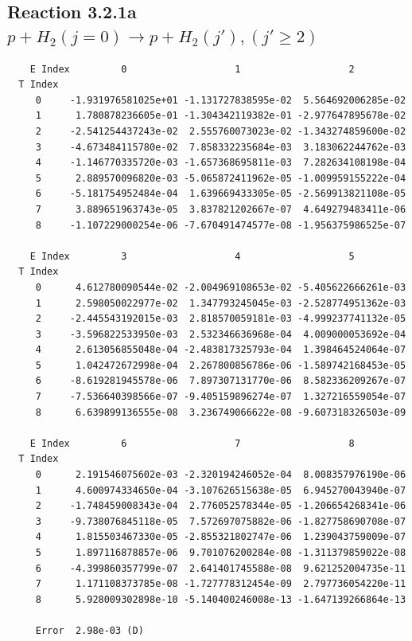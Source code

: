 \documentclass[12pt,dvipdfmx]{article}
\begin{document}
\newpage
\subsection{
Reaction 3.2.1a $  p + H_2(j=0) \rightarrow p + H_2(j'), (j' \geq 2)$}


\begin{small}\begin{verbatim}
    E Index         0                   1                   2
  T Index
     0     -1.931976581025e+01 -1.131727838595e-02  5.564692006285e-02
     1      1.780878236605e-01 -1.304342119382e-01 -2.977647895678e-02
     2     -2.541254437243e-02  2.555760073023e-02 -1.343274859600e-02
     3     -4.673484115780e-02  7.858332235684e-03  3.183062244762e-03
     4     -1.146770335720e-03 -1.657368695811e-03  7.282634108198e-04
     5      2.889570096820e-03 -5.065872411962e-05 -1.009959155222e-04
     6     -5.181754952484e-04  1.639669433305e-05 -2.569913821108e-05
     7      3.889651963743e-05  3.837821202667e-07  4.649279483411e-06
     8     -1.107229000254e-06 -7.670491474577e-08 -1.956375986525e-07

    E Index         3                   4                   5
  T Index
     0      4.612780090544e-02 -2.004969108653e-02 -5.405622666261e-03
     1      2.598050022977e-02  1.347793245045e-03 -2.528774951362e-03
     2     -2.445543192015e-03  2.818570059181e-03 -4.999237741132e-05
     3     -3.596822533950e-03  2.532346636968e-04  4.009000053692e-04
     4      2.613056855048e-04 -2.483817325793e-04  1.398464524064e-07
     5      1.042472672998e-04  2.267800856786e-06 -1.589742168453e-05
     6     -8.619281945578e-06  7.897307131770e-06  8.582336209267e-07
     7     -7.536640398566e-07 -9.405159896274e-07  1.327216559054e-07
     8      6.639899136555e-08  3.236749066622e-08 -9.607318326503e-09

    E Index         6                   7                   8
  T Index
     0      2.191546075602e-03 -2.320194246052e-04  8.008357976190e-06
     1      4.600974334650e-04 -3.107626515638e-05  6.945270043940e-07
     2     -1.748459008343e-04  2.776052578344e-05 -1.206654268341e-06
     3     -9.738076845118e-05  7.572697075882e-06 -1.827758690708e-07
     4      1.815503467330e-05 -2.855321802747e-06  1.239043759009e-07
     5      1.897116878857e-06  9.701076200284e-08 -1.311379859022e-08
     6     -4.399860357799e-07  2.641401745588e-08  9.621252004735e-11
     7      1.171108373785e-08 -1.727778312454e-09  2.797736054220e-11
     8      5.928009302898e-10 -5.140400246008e-13 -1.647139266864e-13

     Error  2.98e-03 (D)
\end{verbatim}\end{small}
\end{document}
